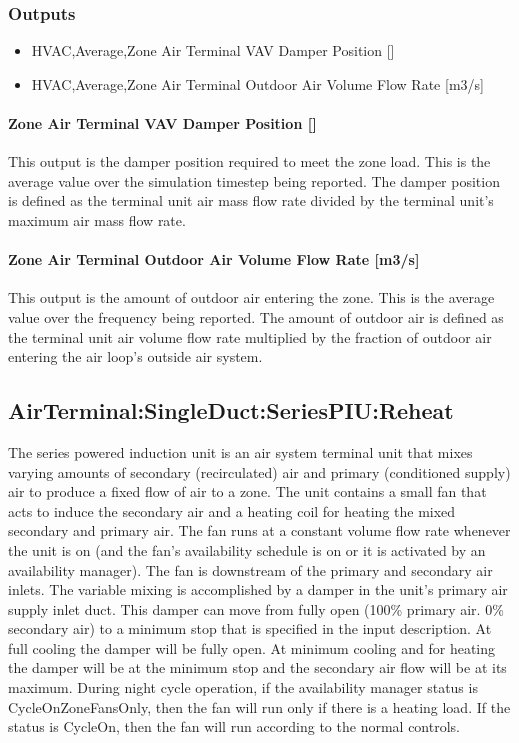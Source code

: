 \subsubsection{Outputs}\label{outputs-6}

\begin{itemize}
\item
  HVAC,Average,Zone Air Terminal VAV Damper Position {[]}
\item
  HVAC,Average,Zone Air Terminal Outdoor Air Volume Flow Rate {[}m3/s{]}
\end{itemize}

\paragraph{Zone Air Terminal VAV Damper Position {[]}}\label{zone-air-terminal-vav-damper-position-4}

This output is the damper position required to meet the zone load. This is the average value over the simulation timestep being reported. The damper position is defined as the terminal unit air mass flow rate divided by the terminal unit's maximum air mass flow rate.

\paragraph{Zone Air Terminal Outdoor Air Volume Flow Rate {[}m3/s{]}}

This output is the amount of outdoor air entering the zone. This is the average value over the frequency being reported. The amount of outdoor air is defined as the terminal unit air volume flow rate multiplied by the fraction of outdoor air entering the air loop's outside air system.

\subsection{AirTerminal:SingleDuct:SeriesPIU:Reheat}\label{airterminalsingleductseriespiureheat}

The series powered induction unit is an air system terminal unit that mixes varying amounts of secondary (recirculated) air and primary (conditioned supply) air to produce a fixed flow of air to a zone. The unit contains a small fan that acts to induce the secondary air and a heating coil for heating the mixed secondary and primary air. The fan runs at a constant volume flow rate whenever the unit is on (and the fan's availability schedule is on or it is activated by an availability manager). The fan is downstream of the primary and secondary air inlets. The variable mixing is accomplished by a damper in the unit's primary air supply inlet duct. This damper can move from fully open (100\% primary air. 0\% secondary air) to a minimum stop that is specified in the input description. At full cooling the damper will be fully open. At minimum cooling and for heating the damper will be at the minimum stop and the secondary air flow will be at its maximum. During night cycle operation, if the availability manager status is CycleOnZoneFansOnly, then the fan will run only if there is a heating load.  If the status is CycleOn, then the fan will run according to the normal controls.


